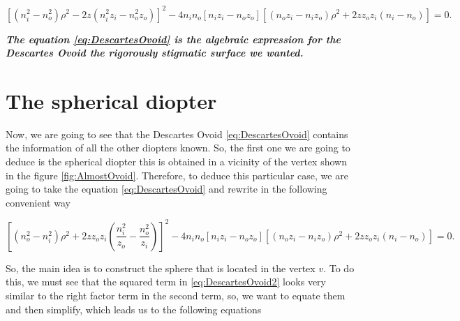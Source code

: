         \begin{equation}\label{eq:DescartesOvoid}
            \left[ \left(n_i^2-n_o^2\right)\rho^2 - 2z\left( n_i^2z_i - n_o^2z_o  \right) \right]^2 - 4n_in_o \left[ n_iz_i - n_oz_o \right]\left[ \left( n_oz_i - n_iz_o \right)\rho^2 + 2zz_oz_i\left(n_i - n_o\right) \right]=0.
        \end{equation}

        \textbf{\textit{The equation \ref{eq:DescartesOvoid} is the algebraic expression for the Descartes Ovoid the rigorously stigmatic surface we wanted.}} 

    \section{The spherical diopter}

        Now, we are going to see that the Descartes Ovoid \ref{eq:DescartesOvoid} contains the information of all the other diopters known. So, the first one we are going to deduce is the spherical diopter this is obtained in a vicinity of the vertex shown in the figure \ref{fig:AlmostOvoid}. Therefore, to deduce this particular case, we are going to take the equation \ref{eq:DescartesOvoid} and rewrite in the following convenient way

        \begin{equation}\label{eq:DescartesOvoid2}
            \left[ \left(n_o^2-n_i^2\right)\rho^2 + 2zz_oz_i\left( \frac{n_i^2}{z_o} - \frac{n_o^2}{z_i}\right) \right]^2 - 4n_in_o \left[ n_iz_i - n_oz_o \right]\left[ \left( n_oz_i - n_iz_o \right)\rho^2 + 2zz_oz_i\left(n_i - n_o\right) \right]=0.
        \end{equation}

        So, the main idea is to construct the sphere that is located in the vertex $v$. To do this, we must see that the squared term in \ref{eq:DescartesOvoid2} looks very similar to the right factor term in the second term, so, we want to equate them and then simplify, which leads us to the following equations

